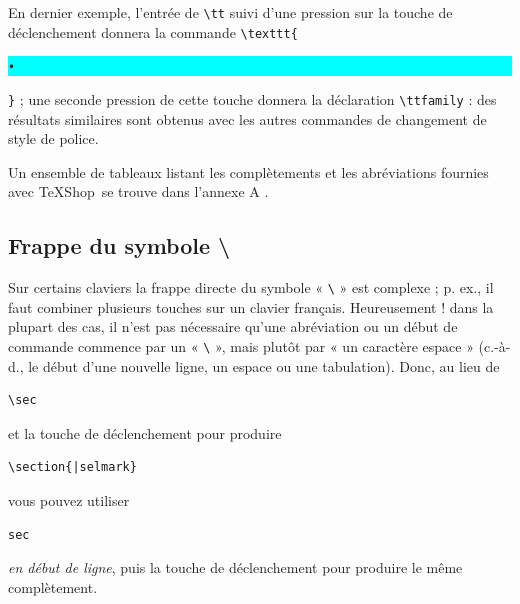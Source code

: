 \documentclass[11pt,french]{article}
\newcommand{\TS}{\textsf{\TeX Shop}}
\newcommand{\cmd}[1]{\textsf{#1}}
\newcommand{\selmark}{\colorbox{cyan}{\rule[-0.5ex]{0ex}{2.1ex}\texttt{•}}}
\begin{document}
En dernier exemple, l'entrée de \verb|\tt| suivi d'une pression sur la touche de déclenchement donnera la commande \verb|\texttt{|\selmark\verb|}| ; une seconde pression de cette touche donnera la déclaration \verb|\ttfamily| : des résultats similaires sont obtenus avec les autres commandes de changement de style de police.



Un ensemble de tableaux listant les complètements et les abréviations fournies avec \TS\ se trouve dans l'annexe A .

\subsection{Frappe du symbole \cmd{\textbackslash}}


Sur certains claviers la frappe directe du symbole « \verb+\+ » est complexe ; p. ex., il faut combiner plusieurs touches sur un clavier français. Heureusement ! dans la plupart des cas, il n'est pas nécessaire qu'une abréviation ou un début de commande commence par un « \verb+\+ », mais plutôt par « un caractère espace » (c.-à-d., le début d'une nouvelle ligne, un espace ou une tabulation). Donc, au lieu de
\begin{verbatim}
\sec
\end{verbatim}
et la touche de déclenchement pour produire
\begin{verbatim}
\section{|selmark}
\end{verbatim}
vous pouvez utiliser
\begin{verbatim}
sec
\end{verbatim}
\emph{en début de ligne}, puis la touche de déclenchement pour produire le même complètement.
\end{document}
